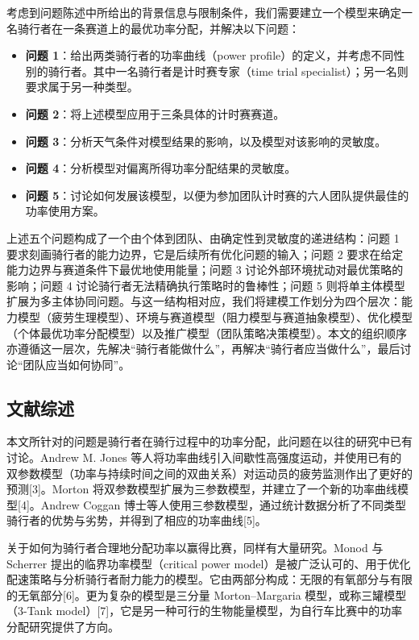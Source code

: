 \documentclass[11pt,a4paper]{ctexart}
\begin{document}
考虑到问题陈述中所给出的背景信息与限制条件，我们需要建立一个模型来确定一名骑行者在一条赛道上的最优功率分配，并解决以下问题：

\begin{itemize}
\item \textbf{问题 1}：给出两类骑行者的功率曲线（power profile）的定义，并考虑不同性别的骑行者。其中一名骑行者是计时赛专家（time trial specialist）；另一名则要求属于另一种类型。
\item \textbf{问题 2}：将上述模型应用于三条具体的计时赛赛道。
\item \textbf{问题 3}：分析天气条件对模型结果的影响，以及模型对该影响的灵敏度。
\item \textbf{问题 4}：分析模型对偏离所得功率分配结果的灵敏度。
\item \textbf{问题 5}：讨论如何发展该模型，以便为参加团队计时赛的六人团队提供最佳的功率使用方案。
\end{itemize}

上述五个问题构成了一个由个体到团队、由确定性到灵敏度的递进结构：问题 1 要求刻画骑行者的能力边界，它是后续所有优化问题的输入；问题 2 要求在给定能力边界与赛道条件下最优地使用能量；问题 3 讨论外部环境扰动对最优策略的影响；问题 4 讨论骑行者无法精确执行策略时的鲁棒性；问题 5 则将单主体模型扩展为多主体协同问题。与这一结构相对应，我们将建模工作划分为四个层次：能力模型（疲劳生理模型）、环境与赛道模型（阻力模型与赛道抽象模型）、优化模型（个体最优功率分配模型）以及推广模型（团队策略决策模型）。本文的组织顺序亦遵循这一层次，先解决“骑行者能做什么”，再解决“骑行者应当做什么”，最后讨论“团队应当如何协同”。

\subsection{文献综述}

本文所针对的问题是骑行者在骑行过程中的功率分配，此问题在以往的研究中已有讨论。Andrew M. Jones 等人将功率曲线引入间歇性高强度运动，并使用已有的双参数模型（功率与持续时间之间的双曲关系）对运动员的疲劳监测作出了更好的预测[3]。Morton 将双参数模型扩展为三参数模型，并建立了一个新的功率曲线模型[4]。Andrew Coggan 博士等人使用三参数模型，通过统计数据分析了不同类型骑行者的优势与劣势，并得到了相应的功率曲线[5]。

关于如何为骑行者合理地分配功率以赢得比赛，同样有大量研究。Monod 与 Scherrer 提出的临界功率模型（critical power model）是被广泛认可的、用于优化配速策略与分析骑行者耐力能力的模型。它由两部分构成：无限的有氧部分与有限的无氧部分[6]。更为复杂的模型是三分量 Morton--Margaria 模型，或称三罐模型（3-Tank model）[7]，它是另一种可行的生物能量模型，为自行车比赛中的功率分配研究提供了方向。
\end{document}
